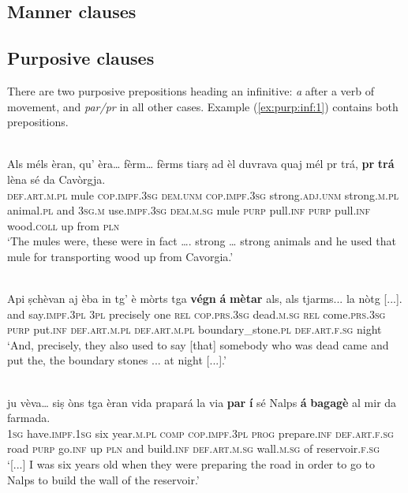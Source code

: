 \subsection{Manner clauses}

\subsection{Purposive clauses}

There are two purposive prepositions heading an infinitive: \textit{a} after a verb of movement, and \textit{par/pr} in all other cases. Example (\ref{ex:purp:inf:1}) contains both prepositions.

\ea\label{ex:purp:inf:3}
\\
\gll Als méls èran, qu’ èra… fèrm… fèrms tiarṣ ad èl duvrava quaj mél pr trá, \textbf{pr} \textbf{trá} lèna sé da Cavòrgja.   \\
\textsc{def.art.m.pl} mule \textsc{cop.impf.3sg} \textsc{dem.unm} \textsc{cop.impf.3sg} strong.\textsc{adj.unm} strong.\textsc{m.pl} animal.\textsc{pl} and \textsc{3sg.m} use.\textsc{impf.3sg} \textsc{dem.m.sg} mule \textsc{purp} pull.\textsc{inf} \textsc{purp} pull.\textsc{inf} wood.\textsc{coll} up from \textsc{pln}  \\
\glt `The mules were, these were in fact …. strong … strong animals and he used that mule for transporting wood up from Cavorgia.'
\z


\ea\label{ex:purp:inf:2}
\\
\gll  Api ṣchèvan aj èba in tg’ è mòrts tga \textbf{végn} \textbf{á} \textbf{mètar} als, als tjarms... la nòtg [...].\\
and say.\textsc{impf.3pl} \textsc{3pl} precisely one \textsc{rel} \textsc{cop.prs.3sg} dead.\textsc{m.sg} \textsc{rel} come.\textsc{prs.3sg} \textsc{purp} put.\textsc{inf} \textsc{def.art.m.pl} \textsc{def.art.m.pl} boundary\_stone.\textsc{pl} \textsc{def.art.f.sg} night \\
\glt `And, precisely, they also used to say [that] somebody who was dead came and put the, the boundary stones ... at night [...].'
\z

\ea
\label{ex:purp:inf:1}
\\
\gll [...] ju vèva… siṣ òns tga èran vida prapará la via \textbf{par} \textbf{í} sé Nalps \textbf{á} \textbf{bagagè} al mir da farmada.\\
{} \textsc{1sg} have.\textsc{impf.1sg} six year.\textsc{m.pl} \textsc{comp} \textsc{cop.impf.3pl} \textsc{prog} prepare.\textsc{inf} \textsc{def.art.f.sg} road \textsc{purp} go.\textsc{inf} up \textsc{pln} and build.\textsc{inf} \textsc{def.art.m.sg} wall.\textsc{m.sg} of reservoir.\textsc{f.sg} \\ 
\glt `[...] I was six years old when they were preparing the road in order to go to Nalps to build the wall of the reservoir.'
\z

